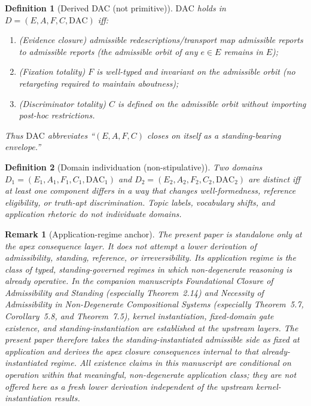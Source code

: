 \documentclass[12pt]{article}
\newtheorem{definition}{Definition}
\newtheorem{remark}{Remark}
\begin{document}
\begin{definition}[Derived DAC (not primitive)]
$\mathrm{DAC}$ holds in $D=(E,A,F,C,\mathrm{DAC})$ iff:
\begin{enumerate}[label=(\alph*), leftmargin=2.2em]
  \item (\emph{Evidence closure}) admissible redescriptions/transport map admissible reports to admissible reports (the admissible orbit of any $e\in E$ remains in $E$);
  \item (\emph{Fixation totality}) $F$ is well-typed and invariant on the admissible orbit (no retargeting required to maintain aboutness);
  \item (\emph{Discriminator totality}) $C$ is defined on the admissible orbit without importing post-hoc restrictions.
\end{enumerate}
Thus $\mathrm{DAC}$ abbreviates ``$(E,A,F,C)$ closes on itself as a standing-bearing envelope.''
\end{definition}

\begin{definition}[Domain individuation (non-stipulative)]
Two domains $D_1=(E_1,A_1,F_1,C_1,\mathrm{DAC}_1)$ and $D_2=(E_2,A_2,F_2,C_2,\mathrm{DAC}_2)$ are distinct iff
at least one component differs in a way that changes well-formedness, reference eligibility, or truth-apt discrimination.
Topic labels, vocabulary shifts, and application rhetoric do not individuate domains.
\end{definition}

\begin{remark}[Application-regime anchor]
\label{rem:app-anchor}
The present paper is standalone only at the apex consequence layer. It does not attempt a lower derivation of admissibility, standing, reference, or irreversibility.
Its application regime is the class of typed, standing-governed regimes in which non-degenerate reasoning is already operative.
In the companion manuscripts \emph{Foundational Closure of Admissibility and Standing} (especially Theorem~2.14) and \emph{Necessity of Admissibility in Non-Degenerate Compositional Systems}
(especially Theorem~5.7, Corollary~5.8, and Theorem~7.5), kernel instantiation, fixed-domain gate existence, and standing-instantiation are established at the upstream layers.
The present paper therefore takes the standing-instantiated admissible side as fixed at application and derives the apex closure consequences internal to that already-instantiated regime.
All existence claims in this manuscript are conditional on operation within that meaningful, non-degenerate application class; they are not offered here as a fresh lower derivation independent of the upstream kernel-instantiation results.
\end{remark}
\end{document}
